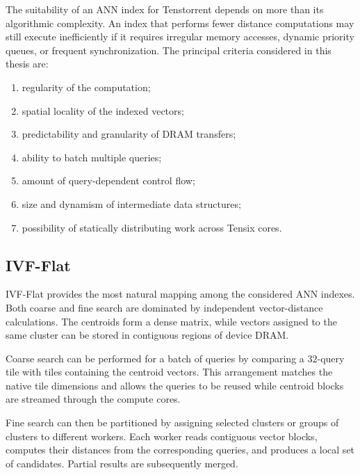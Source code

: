 The suitability of an ANN index for Tenstorrent depends on more than its algorithmic complexity. An index that performs fewer distance computations may still execute inefficiently if it requires irregular memory accesses, dynamic priority queues, or frequent synchronization.
\newline
The principal criteria considered in this thesis are:
\begin{enumerate}
\item regularity of the computation;
\item spatial locality of the indexed vectors;
\item predictability and granularity of DRAM transfers;
\item ability to batch multiple queries;
\item amount of query-dependent control flow;
\item size and dynamism of intermediate data structures;
\item possibility of statically distributing work across Tensix cores.
\end{enumerate}

\subsection{IVF-Flat}
\label{subsec:ivf-tt-fit}

IVF-Flat provides the most natural mapping among the considered ANN indexes. Both coarse and fine search are dominated by independent vector-distance calculations. The centroids form a dense matrix, while vectors assigned to the same cluster can be stored in contiguous regions of device DRAM.

Coarse search can be performed for a batch of queries by comparing a \(32\)-query tile with tiles containing the centroid vectors. This arrangement matches the native tile dimensions and allows the queries to be reused while centroid blocks are streamed through the compute cores.

Fine search can then be partitioned by assigning selected clusters or groups of clusters to different workers. Each worker reads contiguous vector blocks, computes their distances from the corresponding queries, and produces a local set of candidates. Partial results are subsequently merged.

